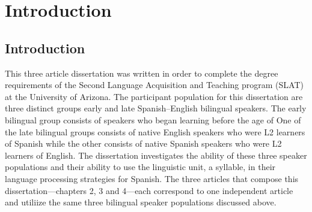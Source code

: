 
\chapter{Introduction} %

\label{Chapter1} %




\section{Introduction}

This three article dissertation was written in order to complete the degree requirements of the Second Language Acquisition and Teaching program (SLAT) at the University of Arizona. The participant population for this dissertation are three distinct groups early and late Spanish–English bilingual speakers. The early bilingual group consists of speakers who began learning before the age of %
One of the late bilingual groups consists of native English speakers who were L2 learners of Spanish while the other consists of native Spanish speakers who were L2 learners of English. The dissertation investigates the ability of these three speaker populations and their ability to use the linguistic unit, a syllable, in their language processing strategies for Spanish. The three articles that compose this dissertation---chapters 2, 3 and 4---each correspond to one independent article and utiliize the same three bilingual speaker populations discussed above.

